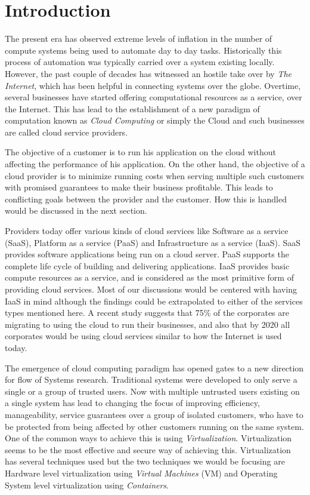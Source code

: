 \chapter{Introduction}
  
  The present era has observed extreme levels of inflation in the number of compute systems being used to automate day to day tasks. 
Historically this process of automation was typically carried over a system existing locally. However, the past couple of 
decades has witnessed an hostile take over by \textit{The Internet}, which has been helpful in connecting systems over the 
globe. Overtime, several businesses have started offering computational resources as a service, over the Internet. This has lead to 
the establishment of a new paradigm of computation known as \textit{Cloud Computing} or simply the Cloud and such businesses are called 
cloud service providers. 

  The objective of a customer is to run his application on the cloud without affecting the performance of his application. On the 
other hand, the objective of a cloud provider is to minimize running costs when serving multiple such customers with promised guarantees to 
make their business profitable. This leads to conflicting goals between the provider and the customer. How this is handled would 
be discussed in the next section. 

Providers today offer various kinds of cloud services like Software as a service (SaaS), Platform as a service (PaaS) and Infrastructure as 
a service (IaaS). SaaS provides software applications being run on a cloud server. PaaS supports the complete life cycle of building and 
delivering applications. IaaS provides basic compute resources as a service, and is considered as the most primitive form of providing 
cloud services. Most of our discussions would be centered with having IaaS in mind although the findings could be extrapolated to either of 
the services types mentioned here. A recent study \cite{forbes} suggests that 75\% of the corporates are migrating to using the cloud to 
run their businesses, and also that by 2020 all corporates would be using cloud services similar to how the Internet is used today.   

  The emergence of cloud computing paradigm has opened gates to a new direction for flow of Systems research. Traditional systems were 
developed to only serve a single or a group of trusted users. Now with multiple untrusted users existing on a single system has 
lead to changing the focus of improving efficiency, manageability, service guarantees over a group of isolated customers, who have to be
protected from being affected by other customers running on the same system. One of the common ways to achieve this is using 
\textit{Virtualization}. Virtualization seems to be the most effective and secure way of achieving this. Virtualization has several 
techniques used but the two techniques we would be focusing are Hardware level virtualization using \textit{Virtual Machines} (VM) and 
Operating System level virtualization using \textit{Containers}. 
  
